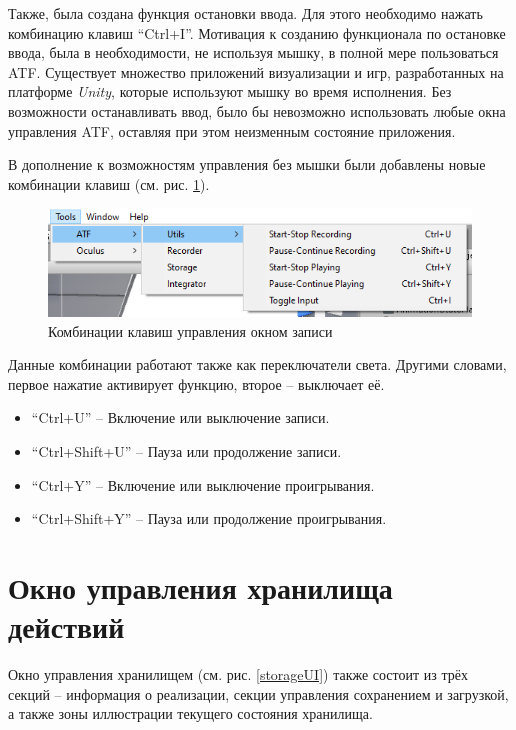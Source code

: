 Также, была создана функция остановки ввода. Для этого необходимо нажать комбинацию клавиш ``Ctrl+I''. Мотивация к созданию функционала по остановке ввода, была в необходимости, не используя мышку, в полной мере пользоваться ATF. Существует множество приложений визуализации и игр, разработанных на платформе \textit{Unity}, которые используют мышку во время исполнения. Без возможности останавливать ввод, было бы невозможно использовать любые окна управления ATF, оставляя при этом неизменным состояние приложения.

В дополнение к возможностям управления без мышки были добавлены новые комбинации клавиш (см. рис. \ref{shortcuts}).

\begin{figure}[h]
	\centering
	\includegraphics[width=\linewidth]{shortcuts.png}
	\caption{Комбинации клавиш управления окном записи}
	\label{shortcuts}
\end{figure}

Данные комбинации работают также как переключатели света. Другими словами, первое нажатие активирует функцию, второе -- выключает её.
\begin{itemize}
	\item ``Ctrl+U'' -- Включение или выключение записи.
	\item ``Ctrl+Shift+U'' -- Пауза или продолжение записи.
	\item ``Ctrl+Y'' -- Включение или выключение проигрывания.
	\item ``Ctrl+Shift+Y'' -- Пауза или продолжение проигрывания.
\end{itemize}

\section{Окно управления хранилища действий}
Окно управления хранилищем (см. рис. \ref{storageUI}) также состоит из трёх секций -- информация о реализации, секции управления сохранением и загрузкой, а также зоны иллюстрации текущего состояния хранилища.

